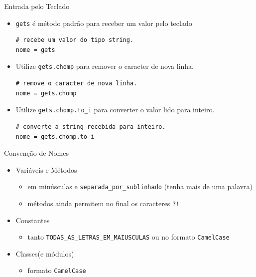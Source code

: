 \begin{frame}[fragile,t]{Entrada pelo Teclado}
  \begin{itemize}
    \item \verb!gets! é método \alert{padrão para receber} um valor pelo teclado 
		\begin{lstlisting}[style=RubyInputStyle]
# recebe um valor do tipo string.
nome = gets
  	\end{lstlisting}
    \item Utilize \verb!gets.chomp! para remover o caracter de nova linha.
		\begin{lstlisting}[style=RubyInputStyle]
# remove o caracter de nova linha.
nome = gets.chomp
  	\end{lstlisting}
  	\item Utilize \verb!gets.chomp.to_i! para converter o valor lido para inteiro. 
		\begin{lstlisting}[style=RubyInputStyle]
# converte a string recebida para inteiro.
nome = gets.chomp.to_i
  	\end{lstlisting}
  \end{itemize}   
\end{frame}
\begin{frame}[fragile,t]{Convenção de Nomes}
  \begin{itemize}
    \item Variáveis e Métodos
    \begin{itemize}
    	\item em \alert{minúsculas} e \verb!separada_por_sublinhado! (tenha mais de uma palavra)
    	\item métodos ainda permitem no final os caracteres \verb|?!|
    \end{itemize}
    \item Constantes
    \begin{itemize}
    	\item tanto \verb!TODAS_AS_LETRAS_EM_MAIUSCULAS! ou no formato \verb!CamelCase!
    \end{itemize}
    \item Classes(e módulos)
    \begin{itemize}
    	\item formato \verb!CamelCase! 
    \end{itemize}
  \end{itemize}
\end{frame}
